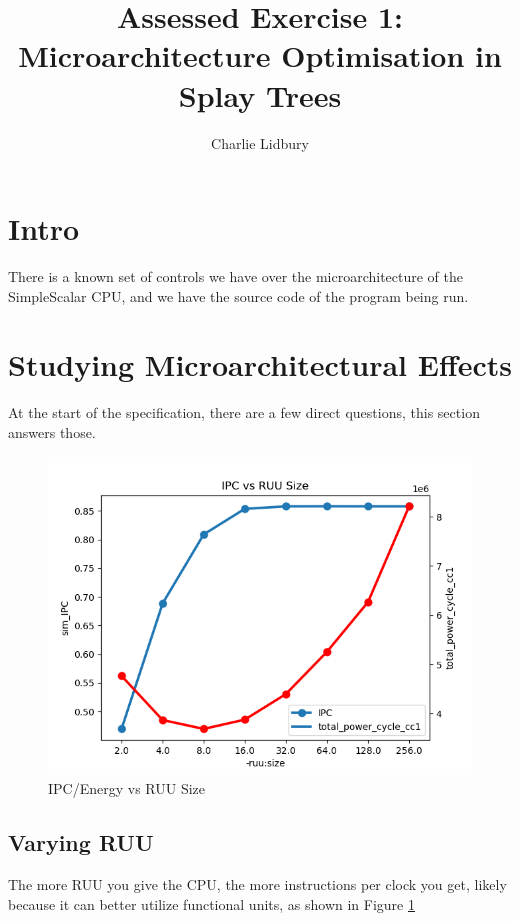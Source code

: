\documentclass{article}
\begin{document}
\title{Assessed Exercise 1: Microarchitecture Optimisation in Splay Trees}
\author{Charlie Lidbury}
\maketitle

\begin{multicols}{2}

  \section{Intro}
  There is a known set of controls we have over the microarchitecture of the SimpleScalar CPU, and we have the source code of the program being run.

  \section{Studying Microarchitectural Effects}
  At the start of the specification, there are a few direct questions, this section answers those.

  \begin{figure}[H]
    \centering
    \includegraphics[width=\linewidth]{./assets/ipc_vs_ruu_size.png}
    \caption{IPC/Energy vs RUU Size}
    \label{fig:ipc_energy_vs_ruu}
  \end{figure}

  \subsection{Varying RUU}
  The more RUU you give the CPU, the more instructions per clock you get, likely because it can better utilize functional units, as shown in Figure \ref{fig:ipc_energy_vs_ruu}


\end{multicols}
\end{document}
